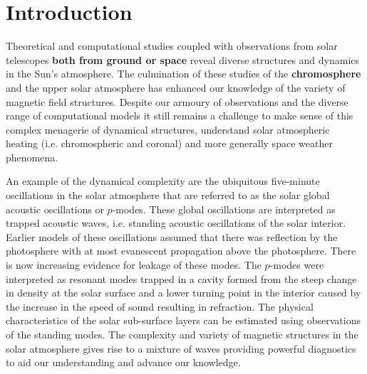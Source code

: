 \documentclass[physics,article,submit,pdftex,moreauthors]{Definitions/mdpi}
\begin{document}
\setcounter{section} %

\section{Introduction}

Theoretical and computational studies coupled with observations from solar telescopes {\bf both from ground or space} reveal diverse structures and dynamics in the Sun's atmosphere. The culmination of these studies of the {\bf chromosphere} and the upper solar atmosphere has enhanced our knowledge of the variety of magnetic field structures.  Despite our armoury of observations and the diverse range of computational models it still remains a challenge to make sense of this complex menagerie of dynamical structures, understand solar atmospheric heating (i.e. chromospheric and coronal) and more generally space weather phenomena.


An example of the dynamical complexity are the ubiquitous five-minute oscillations in the solar atmosphere that are referred to as the solar global acoustic oscillations or $p$-modes. These global oscillations are interpreted as trapped acoustic waves, i.e. standing acoustic oscillations of the solar interior. Earlier models of these oscillations assumed that there was reflection by the photosphere with at most evanescent propagation above the photosphere. There is now increasing evidence for leakage of these modes. The $p$-modes were interpreted as resonant modes trapped in a cavity formed from the steep change in density at the solar surface and a lower turning point in the interior caused by the increase in the speed of sound resulting in refraction. The physical characteristics of the solar sub-surface layers can be estimated using observations of the standing modes. The complexity and variety of magnetic structures in the solar atmosphere gives rise to a mixture of waves providing powerful diagnostics to aid our understanding and advance our knowledge.
\end{document}
